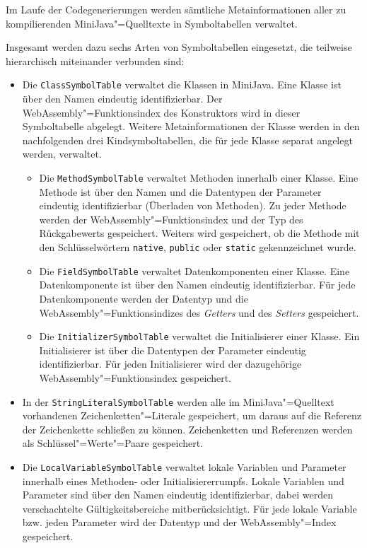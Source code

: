 Im Laufe der Codegenerierungen werden sämtliche Metainformationen aller zu kompilierenden MiniJava"=Quelltexte in Symboltabellen verwaltet.

Insgesamt werden dazu sechs Arten von Symboltabellen eingesetzt, die teilweise hierarchisch miteinander verbunden sind:
\begin{itemize}
    \item Die \lstinline{ClassSymbolTable} verwaltet die Klassen in MiniJava. Eine Klasse ist über den Namen eindeutig identifizierbar. Der WebAssembly"=Funktionsindex des Konstruktors wird in dieser Symboltabelle abgelegt. Weitere Metainformationen der Klasse werden in den nachfolgenden drei Kindsymboltabellen, die für jede Klasse separat angelegt werden, verwaltet.
    \begin{itemize}
        \item Die \lstinline{MethodSymbolTable} verwaltet Methoden innerhalb einer Klasse. Eine Methode ist über den Namen und die Datentypen der Parameter eindeutig identifizierbar (Überladen von Methoden). Zu jeder Methode werden der WebAssembly"=Funktionsindex und der Typ des Rückgabewerts gespeichert. Weiters wird gespeichert, ob die Methode mit den Schlüsselwörtern \lstinline{native}, \lstinline{public} oder \lstinline{static}  gekennzeichnet wurde.
        \item Die \lstinline{FieldSymbolTable} verwaltet Datenkomponenten einer Klasse. Eine Datenkomponente ist über den Namen eindeutig identifizierbar. Für jede Datenkomponente werden der Datentyp und die WebAssembly"=Funktionsindizes des \emph{Getters} und des \emph{Setters} gespeichert.
        \item Die \lstinline{InitializerSymbolTable} verwaltet die Initialisierer einer Klasse. Ein Initialisierer ist über die Datentypen der Parameter eindeutig identifizierbar. Für jeden Initialisierer wird der dazugehörige WebAssembly"=Funktionsindex gespeichert.
    \end{itemize}
    \item In der \lstinline{StringLiteralSymbolTable} werden alle im MiniJava"=Quelltext vorhandenen Zeichenketten"=Literale gespeichert, um daraus auf die Referenz der Zeichenkette schließen zu können. Zeichenketten und Referenzen werden als Schlüssel"=Werte"=Paare gespeichert.
    \item Die \lstinline{LocalVariableSymbolTable} verwaltet lokale Variablen und Parameter innerhalb eines Methoden- oder Initialisiererrumpfs. Lokale Variablen und Parameter sind über den Namen eindeutig identifizierbar, dabei werden verschachtelte Gültigkeitsbereiche mitberücksichtigt. Für jede lokale Variable bzw. jeden Parameter wird der Datentyp und der WebAssembly"=Index gespeichert.
\end{itemize}

